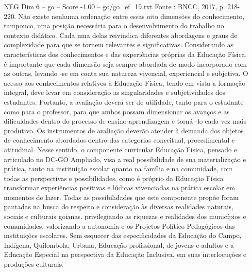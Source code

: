 \begin{textsample}{NEG Dim 6 – go – Score -1.00 – go/go\_ef\_19.txt}
Fonte : BNCC, 2017, p. 218-220.
Não existe nenhuma ordenação entre essas oito dimensões do conhecimento, tampouco, uma posição necessária para o desenvolvimento do trabalho no contexto didático.
Cada uma delas reivindica diferentes abordagens e graus de complexidade para que se tornem relevantes e significativas.
Considerando as características dos conhecimentos e das experiências próprias da Educação Física, é importante que cada dimensão seja sempre abordada de modo incorporado com as outras, levando -se em conta sua natureza vivencial, experiencial e subjetiva.
O acesso aos conhecimentos relativos à Educação Física, tendo em vista a formação integral, deve levar em consideração as singularidades e subjetividades dos estudantes.
Portanto, a avaliação deverá ser de utilidade, tanto para o estudante como para o professor, para que ambos possam dimensionar os avanços e as dificuldades dentro do processo de ensino-aprendizagem e torná -lo cada vez mais produtivo.
Os instrumentos de avaliação deverão atender à demanda dos objetos de conhecimento abordados dentro das categorias conceitual, procedimental e atitudinal.
Nesse sentido, o componente curricular Educação Física, pensado e articulado no DC-GO Ampliado, visa a real possibilidade de sua materialização e prática, tanto na instituição escolar quanto na família e na comunidade, com todas as perspectivas e possibilidades, como é próprio da Educação Física transformar experiências positivas e lúdicas vivenciadas na prática escolar em momentos de lazer.
Todas as possibilidades que este componente propõe foram pautadas na busca do respeito e consideração às diversas realidades naturais, sociais e culturais goianas, privilegiando as riquezas e realidades dos municípios e comunidades, valorizando a autonomia e os Projetos Político-Pedagógicos das instituições escolares.
Sem esquecer das especificidades da Educação do Campo, Indígena, Quilombola, Urbana, Educação profissional, de jovens e adultos e a Educação Especial na perspectiva da Educação Inclusiva, em suas interlocuções e produções culturais.

\end{textsample}
